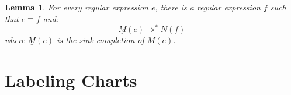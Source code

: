 \documentclass{article}
\newtheorem{definition}{Definition}[section]
\newtheorem{lemma}[definition]{Lemma}
\begin{document}





\begin{lemma}\label{prop:Milner-is-reducible}For every regular expression $e$,
     there is a regular expression $f$ such that $e\equiv f$ and:
     $$\underline{M}(e)\twoheadrightarrow^*
      N(f)$$
   where $\underline{M}(e)$ is the sink completion of $M(e)$.
\end{lemma}

\section{Labeling Charts}
\end{document}
